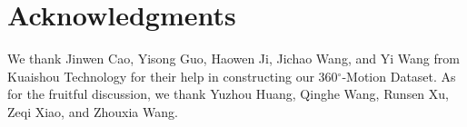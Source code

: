 \section*{Acknowledgments}

We thank Jinwen Cao, Yisong Guo, Haowen Ji, Jichao Wang, and Yi Wang from Kuaishou Technology for their help in constructing our 360$^{\circ}$-Motion Dataset. As for the fruitful discussion, we thank Yuzhou Huang, Qinghe Wang, Runsen Xu, Zeqi Xiao, and Zhouxia Wang. 
